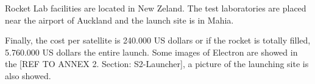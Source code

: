 Rocket Lab facilities are located in New Zeland. The test laboratories are placed near the airport of Auckland and the launch site is in Mahia.

Finally, the cost per satellite is 240.000 US dollars or if the rocket is totally filled, 5.760.000 US dollars the entire launch. Some images of Electron are showed in the  [{REF TO ANNEX 2. Section: S2-Launcher}], a picture of the launching site is also showed. 